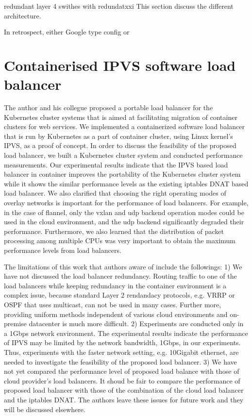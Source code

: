 redundant layer 4 swithes with redundatxxi
This section discuss the different architecture.

In retrospect,  either Google type config or 

\section{Containerised IPVS software load balancer}\label{IPVS}


The author and his collegue proposed a portable load balancer for the Kubernetes cluster systems 
that is aimed at facilitating migration of container clusters for web services.
We implemented a containerized software load balancer that is run by Kubernetes as a part of container cluster, 
using Linux kernel's IPVS, as a proof of concept.
In order to discuss the feasibility of the proposed load balancer, we built 
a Kubernetes cluster system and conducted performance measurements.
Our experimental results indicate that the IPVS based load balancer in container improves the portability of 
the Kubernetes cluster system while it shows the similar performance levels as the existing iptables DNAT based load balancer.
We also clarified that choosing the right operating modes of overlay networks is important for the performance of load balancers. 
For example, in the case of flannel, only the vxlan and udp backend operation modes could be used 
in the cloud environment, and the udp backend significantly degraded their performance.
Furthermore, we also learned that the distribution of packet processing among multiple CPUs was very important
to obtain the maximum performance levels from load balancers.
%

The limitations of this work that authors aware of include the followings: 
1) We have not discussed the load balancer redundancy. 
Routing traffic to one of the load balancers while keeping redundancy in the container environment is a complex issue,
because standard Layer 2 rendandacy protocols, e.g. VRRP or OSPF\cite{moy1997ospf} that uses multicast, can not be used in many cases.
Further more, providing uniform methods independent of various cloud environments and on-premise datacenter is much more difficult.   
2) Experiments are conducted only in a 1Gbps network environment.
The experimental results indicate the performance of IPVS may be limited by the network bandwidth, 1Gbps, in our experiments. 
Thus, experiments with the faster network setting, e.g. 10Gigabit ethernet, are needed to investigate the feasibility of the proposed load balancer.
3) We have not yet compared the performance level of proposed load balance with those of cloud provider's load balancers.
It shoud be fair to compare the performance of proposed load balancer with those of the combination of the cloud load balancer and the iptables DNAT. 
The authors leave these issues for future work and they will be discussed elsewhere.


